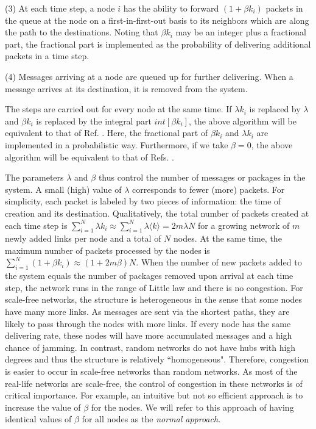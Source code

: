 \documentclass[aps,prl,twocolumn,superscriptaddress,showpacs]{revtex4}
\begin{document}
\noindent (3) At each time step, a node $i$ has the ability to
forward $(1+\beta k_i)$ packets in the queue at the node on a
first-in-first-out basis to its neighbors which are along the path
to the destinations.  Noting that $\beta k_{i}$ may be an integer
plus a fractional part, the fractional part is implemented as the
probability of delivering additional packets in a time step.

\noindent (4) Messages arriving at a node are queued up for
further delivering.  When a message arrives at its destination, it
is removed from the system.

\noindent The steps are carried out for every node at the same
time. If $\lambda k_i$ is replaced by $\lambda$ and $\beta k_i$ is
replaced by the integral part $int[\beta k_i]$, the above
algorithm will be equivalent to that of Ref. \cite{zhao:2005}.
Here, the fractional part of $\beta k_i$ and $\lambda k_{i}$ are
implemented in a probabilistic way.  Furthermore, if we take
$\beta=0$, the above algorithm will be equivalent to that of Refs.
\cite{Li:1989,Leland:1993,Taqqu:1997,Crove:1997,Falout:1999,
Toru:1998,Fuks:1999,Sole:2001,Arena:2001,Guim:2001,Guim:2002,Woolf:2002,
Valv:2002,arenas1:2002,arenas2:2004,arenas3:2003,moreno1:2003,moreno2:2004,moreno3:2004}.


The parameters $\lambda$ and $\beta$ thus control the number of
messages or packages in the system.  A small (high) value of
$\lambda$ corresponds to fewer (more) packets. For simplicity,
each packet is labeled by two pieces of information: the time of
creation and its destination. Qualitatively, the total number of
packets created at each time step is $\sum_{i=1}^N \lambda k_i
\approx \sum_{i=1}^{N} \lambda \langle k \rangle = 2m\lambda N$
for a growing network of $m$ newly added links per node and a
total of $N$ nodes. At the same time, the maximum number of
packets processed by the nodes is $\sum_{i=1}^N(1+\beta
k_i)\approx (1+2m\beta)N$. When the number of new packets added to
the system equals the number of packages removed upon arrival at
each time step, the network runs in the range of Little law
\cite{Allen:1990} and there is no congestion. For scale-free
networks, the structure is heterogeneous in the sense that some
nodes have many more links.  As messages are sent via the shortest
paths, they are likely to pass through the nodes with more links.
If every node has the same delivering rate, these nodes will have
more accumulated messages and a high chance of jamming. In
contrast, random networks do not have hubs with high degrees and
thus the structure is relatively ``homogeneous".  Therefore,
congestion is easier to occur in scale-free networks than random
networks.  As most of the real-life networks are scale-free, the
control of congestion in these networks is of critical importance.
For example, an intuitive but not so efficient approach is to
increase the value of $\beta$ for the nodes.  We will refer to
this approach of having identical values of $\beta$ for all nodes
as the {\em normal approach}.
\end{document}
